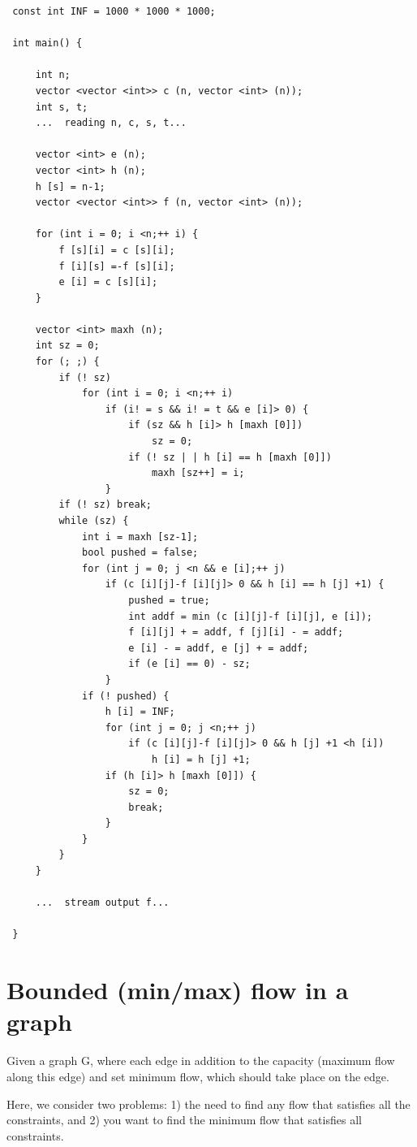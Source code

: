 \begin{verbatim}
 const int INF = 1000 * 1000 * 1000;

 int main() {

     int n;
     vector <vector <int>> c (n, vector <int> (n));
     int s, t;
     ...  reading n, c, s, t...

     vector <int> e (n);
     vector <int> h (n);
     h [s] = n-1;
     vector <vector <int>> f (n, vector <int> (n));

     for (int i = 0; i <n;++ i) {
         f [s][i] = c [s][i];
         f [i][s] =-f [s][i];
         e [i] = c [s][i];
     }

     vector <int> maxh (n);
     int sz = 0;
     for (; ;) {
         if (! sz)
             for (int i = 0; i <n;++ i)
                 if (i! = s && i! = t && e [i]> 0) {
                     if (sz && h [i]> h [maxh [0]])
                         sz = 0;
                     if (! sz | | h [i] == h [maxh [0]])
                         maxh [sz++] = i;
                 }
         if (! sz) break;
         while (sz) {
             int i = maxh [sz-1];
             bool pushed = false;
             for (int j = 0; j <n && e [i];++ j)
                 if (c [i][j]-f [i][j]> 0 && h [i] == h [j] +1) {
                     pushed = true;
                     int addf = min (c [i][j]-f [i][j], e [i]);
                     f [i][j] + = addf, f [j][i] - = addf;
                     e [i] - = addf, e [j] + = addf;
                     if (e [i] == 0) - sz;
                 }
             if (! pushed) {
                 h [i] = INF;
                 for (int j = 0; j <n;++ j)
                     if (c [i][j]-f [i][j]> 0 && h [j] +1 <h [i])
                         h [i] = h [j] +1;
                 if (h [i]> h [maxh [0]]) {
                     sz = 0;
                     break;
                 }
             }
         }
     }

     ...  stream output f...

 } 
\end{verbatim}
\section{ Bounded (min/max) flow in a graph }
Given a graph G, where each edge in addition to the capacity (maximum flow along this edge) and set minimum flow, which should take place on the edge.

Here, we consider two problems: 1) the need to find any flow that satisfies all the constraints, and 2) you want to find the minimum flow that satisfies all constraints.

